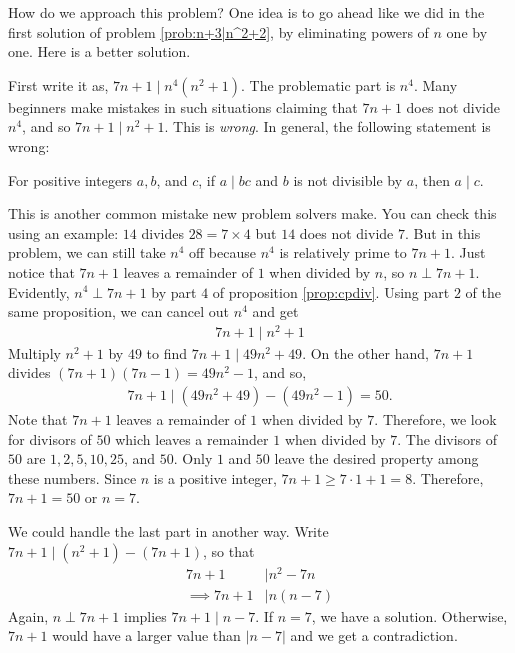 	\begin{solution}
		How do we approach this problem? One idea is to go ahead like we did in the first solution of problem \eqref{prob:n+3|n^2+2}, by eliminating powers of $n$ one by one. Here is a better solution.

		First write it as, $7n+1 \mid n^4(n^2+1)$. The problematic part is $n^4$. Many beginners make mistakes in such situations claiming that $7n+1$ does not divide $n^4$, and so $7n+1 \mid n^2+1$. This is \textit{wrong}. In general, the following statement is wrong:
		\begin{displayquote}
			For positive integers $a,b$, and $c$, if $a\mid bc$ and $b$ is not divisible by $a$, then $a\mid c$.
		\end{displayquote}
		This is another common  mistake new problem solvers make. You can check this using an example: $14$ divides $28=7\times4$ but $14$ does not divide $7$. But in this problem, we can still take $n^4$ off because $n^4$ is relatively prime to $7n+1$. Just notice that $7n+1$ leaves a remainder of $1$ when divided by $n$, so $n\perp7n+1$. Evidently, $n^4\perp7n+1$ by part $4$ of proposition \eqref{prop:cpdiv}. Using part $2$ of the same proposition, we can cancel out $n^4$ and get
			\begin{align*}
				7n+1  \mid n^2+1
			\end{align*}
		Multiply $n^2+1$ by $49$ to find $ 7n+1 \mid 49n^2+49$. On the other hand, $7n+1$ divides $(7n+1)(7n-1)=49n^2-1$, and so,
			\begin{align*}
				7n+1 \mid (49n^2+49)-(49n^2-1) = 50.
			\end{align*}
		Note that $7n+1$ leaves a remainder of $1$ when divided by $7$. Therefore, we look for divisors of $50$ which leaves a remainder $1$ when divided by $7$. The divisors of $50$ are $1,2,5,10,25$, and $50$. Only $1$ and $50$ leave the desired property among these numbers. Since $n$ is a positive integer, $7n+1\geq7\cdot1+1=8$. Therefore, $7n+1=50$ or $n=7$.
	\end{solution}

	\begin{remark}
		We could handle the last part in another way. Write $7n+1\mid (n^2+1)-(7n+1)$, so that
			\begin{align*}
				7n+1
					& \mid n^2-7n\\
				\implies 7n+1
					& \mid  n(n-7)
			\end{align*}
		Again, $n\perp7n+1$ implies $7n+1\mid n-7$. If $n=7$, we have a solution. Otherwise, $7n+1$ would have a larger value than $|n-7|$ and we get a contradiction.
	\end{remark}

